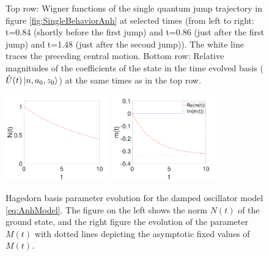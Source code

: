 \documentclass[12pt]{iopart} %
\begin{document}
\begin{figure}
\begin{centering}
\caption{Top row: Wigner functions of the single quantum jump trajectory in figure \ref{fig:SingleBehaviorAnh} at selected times (from left to right: t=0.84 (shortly before the first jump) and t=0.86 (just after the first jump) and t=1.48 (just after the second jump)). The white line traces the preceding central motion. Bottom row: Relative magnitudes of the coefficients of the state in the time evolved basis ($\hat U(t)\ket{n,a_0,z_0}$) at the same times as in the top row.} \label{fig:WigPlotsAnh_QJ}

\end{centering}
\end{figure}
\begin{figure}[tb] 
\begin{centering}
	  \includegraphics[width=0.4\textwidth]{ntAnh.pdf}
	  \includegraphics[width=0.4\textwidth]{mtAnh.pdf}
\caption{Hagedorn basis parameter evolution for the damped oscillator model \cref{eq:AnhModel}. The figure on the left shows the norm $N(t)$ of the ground state, and the right figure the evolution of the parameter $M(t)$ with dotted lines depicting the asymptotic fixed values of $M(t)$. } \label{fig:HagedornVarsAnh}
\end{centering}
\end{figure}
\end{document}
